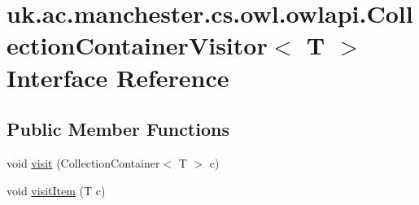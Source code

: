 \hypertarget{interfaceuk_1_1ac_1_1manchester_1_1cs_1_1owl_1_1owlapi_1_1_collection_container_visitor_3_01_t_01_4}{\section{uk.\-ac.\-manchester.\-cs.\-owl.\-owlapi.\-Collection\-Container\-Visitor$<$ T $>$ Interface Reference}
\label{interfaceuk_1_1ac_1_1manchester_1_1cs_1_1owl_1_1owlapi_1_1_collection_container_visitor_3_01_t_01_4}
}
\subsection*{Public Member Functions}
\begin{DoxyCompactItemize}
\item 
void \hyperlink{interfaceuk_1_1ac_1_1manchester_1_1cs_1_1owl_1_1owlapi_1_1_collection_container_visitor_3_01_t_01_4_afd2b875c18b2ae53a2862f45df5b0be9}{visit} (Collection\-Container$<$ T $>$ c)
\item 
void \hyperlink{interfaceuk_1_1ac_1_1manchester_1_1cs_1_1owl_1_1owlapi_1_1_collection_container_visitor_3_01_t_01_4_ab0d26dfd9824ab484874d5953b7f0365}{visit\-Item} (T c)
\end{DoxyCompactItemize}


